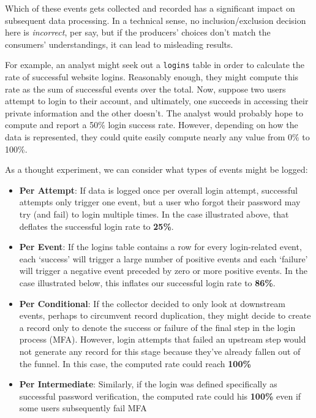 \documentclass[
]{krantz}
\providecommand{\tightlist}{%
  \setlength{\itemsep}{0pt}\setlength{\parskip}{0pt}}
\begin{document}
Which of these events gets collected and recorded has a significant impact on subsequent data processing.
In a technical sense, no inclusion/exclusion decision here is \emph{incorrect}, per say, but if the producers' choices don't match the consumers' understandings, it can lead to misleading results.

For example, an analyst might seek out a \texttt{logins} table in order to calculate the rate of successful website logins.
Reasonably enough, they might compute this rate as the sum of successful events over the total.
Now, suppose two users attempt to login to their account, and ultimately, one succeeds in accessing their private information and the other doesn't.
The analyst would probably hope to compute and report a 50\% login success rate. However, depending on how the data is represented, they could quite easily compute nearly any value from 0\% to 100\%.

As a thought experiment, we can consider what types of events might be logged:

\begin{itemize}
\tightlist
\item
  \textbf{Per Attempt}: If data is logged once per overall login attempt, successful attempts only trigger one event, but a user who forgot their password may try (and fail) to login multiple times. In the case illustrated above, that deflates the successful login rate to \textbf{25\%}.
\item
  \textbf{Per Event}: If the logins table contains a row for every login-related event, each `success' will trigger a large number of positive events and each `failure' will trigger a negative event preceded by zero or more positive events. In the case illustrated below, this inflates our successful login rate to \textbf{86\%}.
\item
  \textbf{Per Conditional}: If the collector decided to only look at downstream events, perhaps to circumvent record duplication, they might decide to create a record only to denote the success or failure of the final step in the login process (MFA). However, login attempts that failed an upstream step would not generate any record for this stage because they've already fallen out of the funnel. In this case, the computed rate could reach \textbf{100\%}
\item
  \textbf{Per Intermediate}: Similarly, if the login was defined specifically as successful password verification, the computed rate could his \textbf{100\%} even if some users subsequently fail MFA
\end{itemize}
\end{document}
